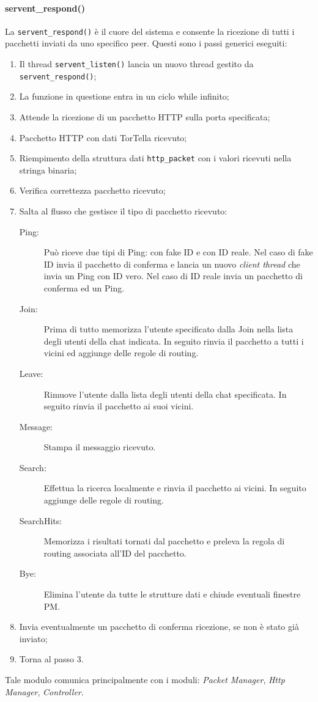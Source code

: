\paragraph{servent\_respond()}
La \texttt{servent\_respond()} è il cuore del sistema e consente la ricezione di tutti i pacchetti inviati da uno specifico peer. Questi sono i passi generici eseguiti:
\begin{enumerate}
\item Il thread \texttt{servent\_listen()} lancia un nuovo thread gestito da \texttt{servent\_respond()};
\item La funzione in questione entra in un ciclo while infinito;
\item Attende la ricezione di un pacchetto HTTP sulla porta specificata;
\item Pacchetto HTTP con dati TorTella ricevuto;
\item Riempimento della struttura dati \texttt{http\_packet} con i valori ricevuti nella stringa binaria;
\item Verifica correttezza pacchetto ricevuto;
\item Salta al flusso che gestisce il tipo di pacchetto ricevuto:
\begin{description}
	\item[Ping:] Può riceve due tipi di Ping: con fake ID e con ID reale. Nel caso di fake ID invia il pacchetto di conferma e lancia un nuovo \textit{client thread} che invia un Ping con ID vero. Nel caso di ID reale invia un pacchetto di conferma ed un Ping.
	\item[Join:] Prima di tutto memorizza l'utente specificato dalla Join nella lista degli utenti della chat indicata. In seguito rinvia il pacchetto a tutti i vicini ed aggiunge delle regole di routing.
	\item[Leave:] Rimuove l'utente dalla lista degli utenti della chat specificata. In seguito rinvia il pacchetto ai suoi vicini.
	\item[Message:] Stampa il messaggio ricevuto.
	\item[Search:] Effettua la ricerca localmente e rinvia il pacchetto ai vicini. In seguito aggiunge delle regole di routing.
	\item[SearchHits:] Memorizza i risultati tornati dal pacchetto e preleva la regola di routing associata all'ID del pacchetto.
	\item[Bye:] Elimina l'utente da tutte le strutture dati e chiude eventuali finestre PM.
\end{description}
\item Invia eventualmente un pacchetto di conferma ricezione, se non è stato già inviato;
\item Torna al passo 3.
\end{enumerate}
Tale modulo comunica principalmente con i moduli: \textit{Packet Manager}, \textit{Http Manager}, \textit{Controller}.

